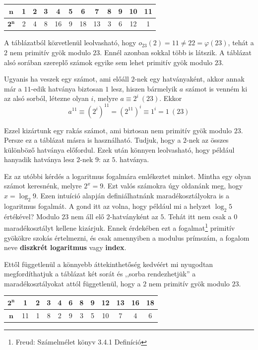 \documentclass[12pt]{book}
\theoremstyle{plain} %
\theoremstyle{definition} %
\theoremstyle{remark}
\numberwithin{equation}{section}  %
\begin{document}
	\begin{center} \begin{large}
		\begin{tabular}{ | c | c | c | c | c | c | c | c | c | c | c | c | }
			\hline
			$\mathbf{n}$ & 1 & 2 & 3 & 4 & 5 & 6 & 7 & 8 & 9 & 10 & 11 \\ 
			\hline
			$\mathbf{2^n}$ & 2 & 4 & 8 & 16 & \color{red}9 & \color{blue}18 & 13 & 3 & 6 & 12 & 1 \\
			\hline   
		\end{tabular}
	\end{large} \end{center}

	A táblázatból közvetlenül leolvasható, hogy $o_{23}(2)=11\neq 22=\varphi(23)$, tehát a $2$ nem primitív gyök modulo $23$. Ennél azonban sokkal több is látszik. A táblázat alsó sorában szereplő számok egyike sem lehet primitív gyök modulo $23$.
	
	Ugyanis ha veszek egy számot, ami előáll $2$-nek egy hatványaként, akkor annak már a $11$-edik hatványa biztosan $1$ lesz, hiszen bármelyik $a$ számot is venném ki az alsó sorból, létezne olyan $i$, melyre $a\equiv 2^i\ (23)$. Ekkor
	\[ a^{11}\equiv (2^i)^{11} = (2^{11})^i \equiv 1^i = 1\ (23) \]
	
	Ezzel kizártunk egy rakás számot, ami biztosan nem primitív gyök modulo $23$. Persze ez a táblázat másra is használható. Tudjuk, hogy a $2$-nek az összes különböző hatványa előfordul. Ezek után könnyen leolvasható, hogy például hanyadik hatványa lesz $2$-nek $9$: az $5$. hatványa.
	
	Ez az utóbbi kérdés a logaritmus fogalmára emlékeztet minket. Mintha egy olyan számot keresnénk, melyre $2^x=9$. Ezt valós számokra úgy oldanánk meg, hogy $x=\log_2 9$. Ezen intuíció alapján definiálhatnánk maradékosztályokra is a logaritmus fogalmát. A gond itt az volna, hogy például mi a helyzet $\log_2 5$ értékével? Modulo $23$ nem áll elő $2$-hatványként az $5$. Tehát itt nem csak a $0$ maradékosztályt kellene kizárjuk. Ennek érdekében ezt a fogalmat\footnote{Freud: Számelmélet könyv 3.4.1 Definíció} primitív gyökökre szokás értelmezni, és csak amennyiben a modulus prímszám, a fogalom neve \textbf{diszkrét logaritmus} vagy \textbf{index}.
	
	Ettől függetlenül a könnyebb áttekinthetőség kedvéért mi nyugodtan megfordíthatjuk a táblázat két sorát és ,,sorba rendezhetjük'' a maradékosztályokat attól függetlenül, hogy a $2$ nem primitív gyök modulo $23$.
	
	\begin{center} \begin{large}
			\begin{tabular}{ | c | c | c | c | c | c | c | c | c | c | c | c | }
				\hline
				$\mathbf{2^n}$ & 1 & 2 & 3 & 4 & 6 & 8 & 9 & 12 & 13 & 16 & 18 \\
				\hline
				$\mathbf{n}$ & 11 & 1 & 8 & 2 & 9 & 3 & 5 & 10 & 7 & 4 & 6 \\ 
				\hline   
			\end{tabular}
	\end{large} \end{center}
	
\end{document}
